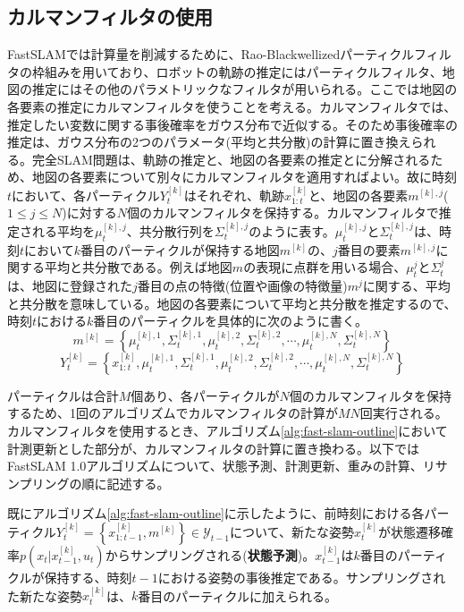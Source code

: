 \documentclass[dvipdfmx,a4paper]{jsarticle}
\begin{document}
\subsection{カルマンフィルタの使用}
FastSLAMでは計算量を削減するために、Rao-Blackwellizedパーティクルフィルタの枠組みを用いており、ロボットの軌跡の推定にはパーティクルフィルタ、地図の推定にはその他のパラメトリックなフィルタが用いられる。ここでは地図の各要素の推定にカルマンフィルタを使うことを考える。カルマンフィルタでは、推定したい変数に関する事後確率をガウス分布で近似する。そのため事後確率の推定は、ガウス分布の2つのパラメータ(平均と共分散)の計算に置き換えられる。完全SLAM問題は、軌跡の推定と、地図の各要素の推定とに分解されるため、地図の各要素について別々にカルマンフィルタを適用すればよい。故に時刻$t$において、各パーティクル$Y_t^{[k]}$はそれぞれ、軌跡$x_{1 : t}^{[k]}$と、地図の各要素$m^{[k], j}$($1 \le j \le N$)に対する$N$個のカルマンフィルタを保持する。カルマンフィルタで推定される平均を$\mu_t^{[k], j}$、共分散行列を$\Sigma_t^{[k], j}$のように表す。$\mu_t^{[k], j}$と$\Sigma_t^{[k], j}$は、時刻$t$において$k$番目のパーティクルが保持する地図$m^{[k]}$の、$j$番目の要素$m^{[k], j}$に関する平均と共分散である。例えば地図$m$の表現に点群を用いる場合、$\mu_t^{j}$と$\Sigma_t^{j}$は、地図に登録された$j$番目の点の特徴(位置や画像の特徴量)$m^j$に関する、平均と共分散を意味している。地図の各要素について平均と共分散を推定するので、時刻$t$における$k$番目のパーティクルを具体的に次のように書く。
\begin{equation}
	m^{[k]} = \left\{ \mu_t^{[k], 1}, \Sigma_t^{[k], 1}, \mu_t^{[k], 2}, \Sigma_t^{[k], 2}, \cdots, \mu_t^{[k], N}, \Sigma_t^{[k], N} \right\}
\end{equation}
\begin{equation}
	Y_t^{[k]} = \left\{ x_{1 : t}^{[k]}, \mu_t^{[k], 1}, \Sigma_t^{[k], 1}, \mu_t^{[k], 2}, \Sigma_t^{[k], 2}, \cdots, \mu_t^{[k], N}, \Sigma_t^{[k], N} \right\}
\end{equation}

パーティクルは合計$M$個あり、各パーティクルが$N$個のカルマンフィルタを保持するため、1回のアルゴリズムでカルマンフィルタの計算が$MN$回実行される。カルマンフィルタを使用するとき、アルゴリズム\ref{alg:fast-slam-outline}において計測更新とした部分が、カルマンフィルタの計算に置き換わる。以下ではFastSLAM 1.0アルゴリズムについて、状態予測、計測更新、重みの計算、リサンプリングの順に記述する。\newline

既にアルゴリズム\ref{alg:fast-slam-outline}に示したように、前時刻における各パーティクル$Y_t^{[k]} = \left\{ x_{1 : t - 1}^{[k]}, m^{[k]} \right\} \in \mathcal{Y}_{t - 1}$について、新たな姿勢$x_t^{[k]}$が状態遷移確率$p(x_t | x_{t - 1}^{[k]}, u_t)$からサンプリングされる(\textbf{状態予測})。$x_{t - 1}^{[k]}$は$k$番目のパーティクルが保持する、時刻$t - 1$における姿勢の事後推定である。サンプリングされた新たな姿勢$x_t^{[k]}$は、$k$番目のパーティクルに加えられる。\newline
\end{document}
